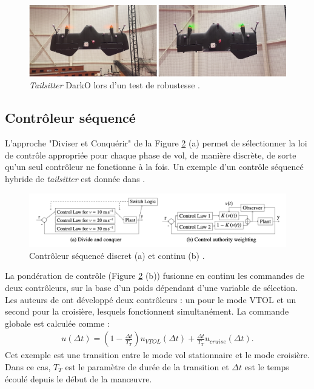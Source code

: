 \begin{figure}[ht!]
    \centerline{
    \includegraphics[trim=0cm 0cm 0cm 0cm,clip,width=0.7\columnwidth]{figures/darko_MFC.png}}
    \caption{\textit{Tailsitter} DarkO lors d'un test de robustesse \cite{olszaneckibarthHal-02542982}.}
    \label{fig:darko_mfc}
\end{figure}



\subsection*{Contrôleur séquencé}
L'approche "Diviser et Conquérir" de la Figure \ref{fig:schemaGainSche} (a) permet de sélectionner la loi de contrôle appropriée pour chaque phase de vol, de manière discrète, de sorte qu'un seul contrôleur ne fonctionne à la fois. Un exemple d'un contrôle séquencé hybride de \textit{tailsitter} est donnée dans \cite{Casau2011}.

\begin{figure}[ht!]
    \centerline{
    \includegraphics[trim=0cm 0cm 0cm 0cm,clip,width=0.9\columnwidth]{figures/gainscheduling.png}}
    \caption{Contrôleur séquencé discret (a) et continu (b) \cite{ducard_review_2021}.}
    \label{fig:schemaGainSche}
\end{figure}

La pondération de contrôle (Figure \ref{fig:schemaGainSche} (b)) fusionne en continu les commandes de deux contrôleurs, sur la base d'un poids dépendant d'une variable de sélection. Les auteurs de \cite{Liang2016} ont développé deux contrôleurs : un pour le mode VTOL et un second pour la croisière, lesquels fonctionnent simultanément. La commande globale est calculée comme  :
\begin{align*}
    u(\Delta t) = (1 - \frac{\Delta t}{T_{T}})u_{VTOL}(\Delta t) + \frac{\Delta t}{T_{T}}u_{cruise}(\Delta t).
\end{align*}
Cet exemple est une transition entre le mode vol stationnaire et le mode croisière. Dans ce cas, $T_{T}$ est le paramètre de durée de la transition et $\Delta t$ est le temps écoulé depuis le début de la manœuvre.

